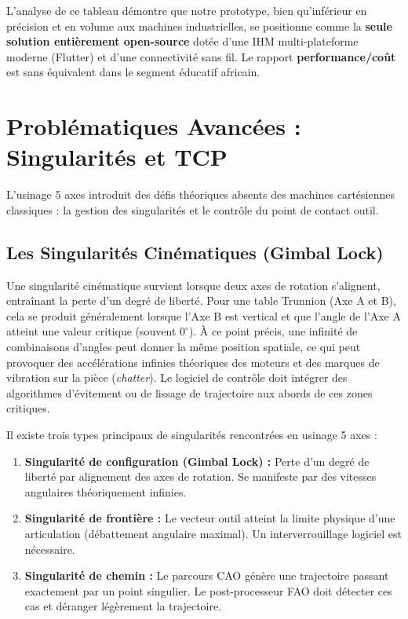 L'analyse de ce tableau démontre que notre prototype, bien qu'inférieur en précision et en volume aux machines industrielles, se positionne comme la \textbf{seule solution entièrement open-source} dotée d'une IHM multi-plateforme moderne (Flutter) et d'une connectivité sans fil. Le rapport \textbf{performance/coût} est sans équivalent dans le segment éducatif africain.

\section{Problématiques Avancées : Singularités et TCP}
L'usinage 5 axes introduit des défis théoriques absents des machines cartésiennes classiques : la gestion des singularités et le contrôle du point de contact outil.

\subsection{Les Singularités Cinématiques (Gimbal Lock)}
Une singularité cinématique survient lorsque deux axes de rotation s'alignent, entraînant la perte d'un degré de liberté. Pour une table Trunnion (Axe A et B), cela se produit généralement lorsque l'Axe B est vertical et que l'angle de l'Axe A atteint une valeur critique (souvent $0^\circ$).
À ce point précis, une infinité de combinaisons d'angles peut donner la même position spatiale, ce qui peut provoquer des accélérations infinies théoriques des moteurs et des marques de vibration sur la pièce (\textit{chatter}). Le logiciel de contrôle doit intégrer des algorithmes d'évitement ou de lissage de trajectoire aux abords de ces zones critiques.

Il existe trois types principaux de singularités rencontrées en usinage 5 axes :
\begin{enumerate}
    \item \textbf{Singularité de configuration (Gimbal Lock) :} Perte d'un degré de liberté par alignement des axes de rotation. Se manifeste par des vitesses angulaires théoriquement infinies.
    \item \textbf{Singularité de frontière :} Le vecteur outil atteint la limite physique d'une articulation (débattement angulaire maximal). Un interverrouillage logiciel est nécessaire.
    \item \textbf{Singularité de chemin :} Le parcours CAO génère une trajectoire passant exactement par un point singulier. Le post-processeur FAO doit détecter ces cas et déranger légèrement la trajectoire.
\end{enumerate}


